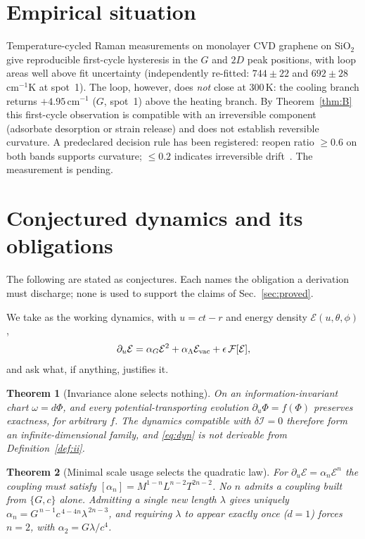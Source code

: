 \documentclass[aps,prd,twocolumn,superscriptaddress,nofootinbib]{revtex4-2}
\newcommand{\cI}{\mathcal{I}}
\newcommand{\cE}{\mathcal{E}}
\newtheorem{theorem}{Theorem}
\begin{document}
\section{Empirical situation}\label{sec:empirical}

Temperature-cycled Raman measurements on monolayer CVD graphene on
SiO$_2$~\cite{Dabas2026} give reproducible first-cycle hysteresis in the $G$ and
$2D$ peak positions, with loop areas well above fit uncertainty (independently
re-fitted: $744\pm22$ and $692\pm28$\,cm$^{-1}$K at spot~1). The loop, however,
does \emph{not} close at $300$\,K: the cooling branch returns $+4.95$\,cm$^{-1}$
($G$, spot~1) above the heating branch. By Theorem~\ref{thm:B} this first-cycle
observation is compatible with an irreversible component (adsorbate desorption
or strain release) and does not establish reversible curvature. A predeclared
decision rule has been registered: reopen ratio $\geq0.6$ on both bands supports
curvature; $\leq0.2$ indicates irreversible drift~\cite{ThermoRepro}. The
measurement is pending.

\section{Conjectured dynamics and its obligations}\label{sec:conj}

The following are stated as conjectures. Each names the obligation a derivation
must discharge; none is used to support the claims of Sec.~\ref{sec:proved}.

We take as the working dynamics, with $u=ct-r$ and energy density
$\cE(u,\theta,\phi)$,
\begin{equation}\label{eq:dyn}
\partial_u\cE=\alpha_G\cE^2+\alpha_\Lambda\cE_{\rm vac}+\epsilon\,\mathcal{F}[\cE],
\end{equation}
and ask what, if anything, justifies it.

\begin{theorem}[Invariance alone selects nothing]\label{thm:I}
On an information-invariant chart $\omega=d\Phi$, and every
potential-transporting evolution $\partial_u\Phi=f(\Phi)$ preserves exactness,
for arbitrary $f$. The dynamics compatible with $\delta\cI=0$ therefore form an
infinite-dimensional family, and \eqref{eq:dyn} is not derivable from
Definition~\ref{def:ii}.
\end{theorem}

\begin{theorem}[Minimal scale usage selects the quadratic law]\label{thm:J}
For $\partial_u\cE=\alpha_n\cE^n$ the coupling must satisfy
$[\alpha_n]=M^{1-n}L^{n-2}T^{2n-2}$. No $n$ admits a coupling built from
$\{G,c\}$ alone. Admitting a single new length $\lambda$ gives uniquely
$\alpha_n=G^{\,n-1}c^{\,4-4n}\lambda^{\,2n-3}$, and requiring $\lambda$ to appear
exactly once ($d=1$) forces $n=2$, with $\alpha_2=G\lambda/c^4$.
\end{theorem}
\end{document}
